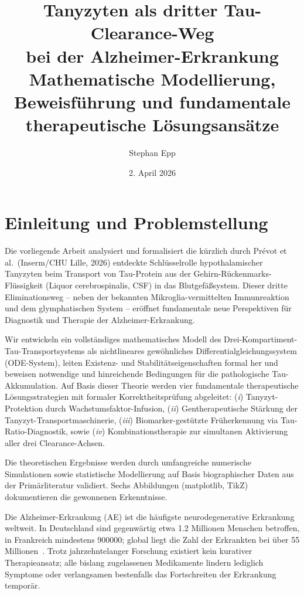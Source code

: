 ﻿\documentclass[12pt,a4paper]{article}
\title{{\bfseries Tanyzyten als dritter Tau-Clearance-Weg \\ bei der Alzheimer-Erkrankung}\\
		Mathematische Modellierung, Beweisführung
		und fundamentale therapeutische Lösungsansätze
}
\author{Stephan Epp}
\date{2. April 2026}
\theoremstyle{definition}
\begin{document}
	
	\maketitle
	\tableofcontents
	\newpage
	
	\section{Einleitung und Problemstellung}
	
	Die vorliegende Arbeit analysiert und formalisiert die kürzlich durch Prévot et al.\ (Inserm/CHU Lille, 2026) entdeckte Schlüsselrolle hypothalamischer Tanyzyten beim Transport von Tau-Protein aus der Gehirn-Rückenmarks-Flüssigkeit (Liquor cerebrospinalis, CSF) in das Blutgefäßsystem. Dieser dritte Eliminationsweg -- neben der bekannten Mikroglia-vermittelten Immunreaktion und dem glymphatischen System -- eröffnet fundamentale neue Perspektiven für Diagnostik und Therapie der Alzheimer-Erkrankung.
	
	Wir entwickeln ein vollständiges mathematisches Modell des Drei-Kompartiment-Tau-Transportsystems als nichtlineares gewöhnliches Differentialgleichungssystem (ODE-System), leiten Existenz- und Stabilitätseigenschaften formal her und beweisen notwendige und hinreichende Bedingungen für die pathologische Tau-Akkumulation. Auf Basis dieser Theorie werden vier fundamentale therapeutische Lösungsstrategien mit formaler Korrektheitsprüfung abgeleitet: (\emph{i}) Tanyzyt-Protektion durch Wachstumsfaktor-Infusion, (\emph{ii}) Gentherapeutische Stärkung der Tanyzyt-Transportmaschinerie, (\emph{iii}) Biomarker-gestützte Früherkennung via Tau-Ratio-Diagnostik, sowie (\emph{iv}) Kombinationstherapie zur simultanen Aktivierung aller drei Clearance-Achsen.
	
	Die theoretischen Ergebnisse werden durch umfangreiche numerische Simulationen sowie statistische Modellierung auf Basis biographischer Daten aus der Primärliteratur validiert. Sechs Abbildungen (matplotlib, TikZ) dokumentieren die gewonnenen Erkenntnisse.
	
	Die Alzheimer-Erkrankung (AE) ist die häufigste neurodegenerative Erkrankung weltweit. In Deutschland sind gegenwärtig etwa \num{1.2} Millionen Menschen betroffen, in Frankreich mindestens \num{900000}; global liegt die Zahl der Erkrankten bei über 55 Millionen~\cite{WHO2023}. Trotz jahrzehntelanger Forschung existiert kein kurativer Therapieansatz; alle bislang zugelassenen Medikamente lindern lediglich Symptome oder verlangsamen bestenfalls das Fortschreiten der Erkrankung temporär.
	
\end{document}
